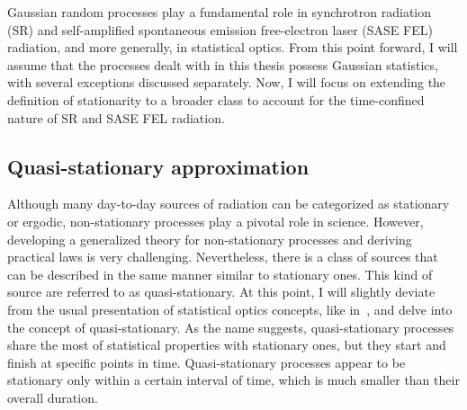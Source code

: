     Gaussian random processes play a fundamental role in synchrotron radiation (SR) and self-amplified spontaneous emission free-electron laser (SASE FEL) radiation, and more generally, in statistical optics. From this point forward, I will assume that the processes dealt with in this thesis possess Gaussian statistics, with several exceptions discussed separately. Now, I will focus on extending the definition of stationarity to a broader class to account for the time-confined nature of SR and SASE FEL radiation.
    
\subsection{Quasi-stationary approximation}

    Although many day-to-day sources of radiation can be categorized as stationary or ergodic, non-stationary processes play a pivotal role in science. However, developing a generalized theory for non-stationary processes and deriving practical laws is very challenging. Nevertheless, there is a class of sources that can be described in the same manner similar to stationary ones. This kind of source are referred to as quasi-stationary. At this point, I will slightly deviate from the usual presentation of statistical optics concepts, like in~\cite{mandel_optical_1995, goodman_statistical_2015}, and delve into the concept of quasi-stationary. As the name suggests, quasi-stationary processes share the most of statistical properties with stationary ones, but they start and finish at specific points in time. Quasi-stationary processes appear to be stationary only within a certain interval of time, which is much smaller than their overall duration.
    
